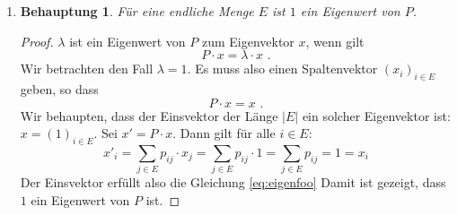 \documentclass[a4paper]{scrartcl}
\newtheorem*{behaupt}{Behauptung}
\def \blattnr {2}
\begin{document}
\begin{enumerate}[label=\bfseries \blattnr.\arabic*]
\begin{enumerate}[label=\alph*)]
            \item
                \begin{behaupt}
                    Für eine endliche Menge $E$ ist $1$ ein Eigenwert von $P$.
                \end{behaupt}
                \begin{proof}
                    $\lambda$ ist ein Eigenwert von $P$ zum Eigenvektor $x$,
                    wenn gilt
                    \begin{equation*}
                        P \cdot x = \lambda \cdot x
                        \text{ .}
                    \end{equation*}
                    Wir betrachten den Fall $\lambda = 1$. Es muss also einen
                    Spaltenvektor $(x_i)_{i \in E}$ geben, so dass
                    \begin{equation}
                        P \cdot x = x
                        \text{ .}
                        \label{eq:eigenfoo}
                    \end{equation}
                    Wir behaupten, dass der Einsvektor der Länge $|E|$ ein
                    solcher Eigenvektor ist: $x = (1)_{i \in E}$.
                    Sei $x' = P \cdot x$. Dann gilt für alle $i \in E$:
                    \begin{equation*}
                        x'_i = \sum_{j \in E} p_{ij} \cdot x_j
                        = \sum_{j \in E} p_{ij} \cdot 1
                        = \sum_{j \in E} p_{ij}
                        = 1
                        = x_i
                    \end{equation*}
                    Der Einsvektor erfüllt also die Gleichung
                    \eqref{eq:eigenfoo} Damit ist gezeigt, dass $1$ ein
                    Eigenwert von $P$ ist.
                \end{proof}

        \end{enumerate}


\end{enumerate}
\end{document}
